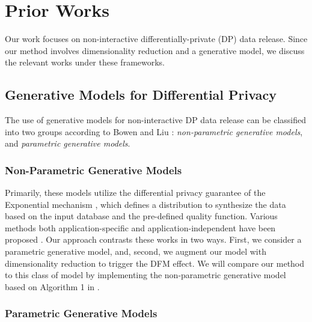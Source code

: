 \documentclass[USenglish,oneside,twocolumn]{article}
\theoremstyle{definition}
\theoremstyle{remark}
\theoremstyle{plain}
\theoremstyle{plain}
\begin{document}
\vspace{-1em}
\section{Prior Works}

\label{sec:Prior-Works}

Our work focuses on non-interactive differentially-private (DP)
data release. Since our method involves dimensionality reduction and a generative model, we discuss the relevant works under these
frameworks.

\vspace{-1em}
\subsection{Generative Models for Differential Privacy}

\label{subsec:generative_models} The use of generative models for non-interactive DP data release can be classified
into two groups according to Bowen and Liu \cite{RefWorks:370}: \emph{non-parametric
generative models}, and \emph{parametric generative models}.

\vspace{-1em}
\subsubsection{Non-Parametric Generative Models}

Primarily, these models utilize the differential privacy guarantee
of the Exponential mechanism \cite{RefWorks:192}, which defines a
distribution to synthesize the data based on the input database and
the pre-defined quality function. Various methods \textendash{} both
application-specific and application-independent \textendash{} have
been proposed \cite{RefWorks:174,RefWorks:192,RefWorks:187,RefWorks:179,RefWorks:237,RefWorks:221,RefWorks:382,RefWorks:383,RefWorks:450,RefWorks:479,RefWorks:480,RefWorks:481,RefWorks:512,RefWorks:449}.
Our approach contrasts these works in two ways. First, we consider
a parametric generative model, and, second, we augment our model with
dimensionality reduction to trigger the DFM effect. We will compare our method
to this class of model by implementing the non-parametric generative
model based on Algorithm 1 in \cite{RefWorks:174}.

\vspace{-1em}
\subsubsection{Parametric Generative Models}
\end{document}
